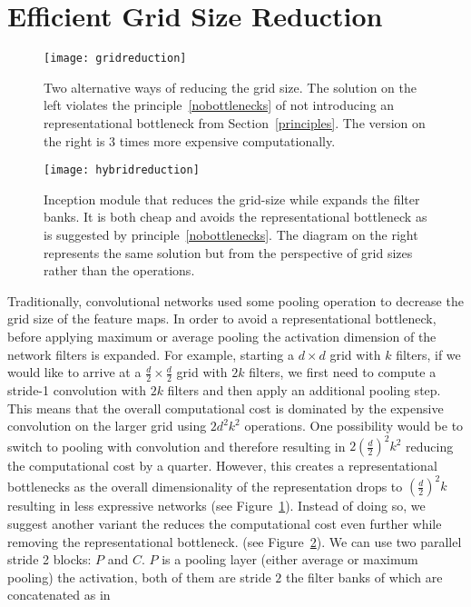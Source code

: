 \documentclass[10pt,twocolumn,letterpaper]{article}
\begin{document}
 \section{Efficient Grid Size Reduction}
\label{gridred}
\begin{figure}
\centering
\texttt{[image: gridreduction]}
\caption{Two alternative ways of reducing the grid size. The solution on the
  left violates the principle~\ref{nobottlenecks} of
  not introducing an representational bottleneck from Section~\ref{principles}.
  The version on the right is $3$ times more expensive computationally.
}
\label{fig:gridreduction}
\end{figure}
\begin{figure}
\centering
\texttt{[image: hybridreduction]}
\caption{Inception module that reduces the grid-size while expands the filter
  banks. It is both cheap and avoids the representational bottleneck as is
  suggested by principle~\ref{nobottlenecks}. 
  The diagram on the right represents the same solution but from the
  perspective of grid sizes rather than the operations.}
\label{fig:hybridreduction}
\end{figure}
Traditionally, convolutional networks used some pooling operation to decrease
the grid size of the feature maps. In order to avoid a representational
bottleneck, before applying maximum or average pooling the activation
dimension of the network filters is expanded.
For example, starting a $d\times d$ grid
with $k$ filters, if we would like to arrive at a
$\frac{d}{2}\times \frac{d}{2}$ grid with $2k$ filters,
we first need to compute a stride-1 convolution with $2k$
filters and then apply an additional pooling step. This means that the overall
computational cost is dominated by the expensive convolution on the larger grid
using $2d^2k^2$ operations. One possibility would be to switch to pooling with
convolution and therefore resulting in $2(\frac{d}{2})^2k^2$ reducing the
computational cost by a quarter. However, this creates a representational
bottlenecks as the overall dimensionality of the representation drops to
$(\frac{d}{2})^2k$ resulting in less expressive networks (see
Figure~\ref{fig:gridreduction}).
Instead of doing so, we suggest another variant the reduces the computational
cost even further while removing the representational bottleneck.
(see Figure~\ref{fig:hybridreduction}).
We can use two parallel stride 2 blocks: $P$ and $C$. $P$ is a pooling layer
(either average or maximum pooling) the activation, both of them are stride
$2$ the filter banks of which are concatenated as in
\end{document}
